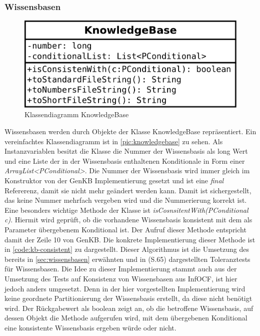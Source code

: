 \documentclass[12pt,a4paper]{article}
\begin{document}
\subsubsection{Wissensbasen}



\begin{figure}
\includegraphics[width=0.45\linewidth]{bilder/KnowledgeBase.png}
\caption{Klassendiagramm KnowledgeBase}
\label{pic:knowledgebase}
\end{figure}



Wissensbasen werden durch Objekte der Klasse KnowledgeBase repräsentiert. Ein vereinfachtes Klassendiagramm ist in \autoref{pic:knowledgebase} zu sehen. Als Instanzvariablen besitzt die Klasse die Nummer der Wissensbasis als long Wert und eine Liste der in der Wissensbasis enthaltenen Konditionale in Form einer \textit{ArrayList<PConditional>}. Die Nummer der Wissensbasis wird immer gleich im Konstruktor von der GenKB Implementierung gesetzt und ist eine \textit{final} Refererenz, damit sie nicht mehr geändert werden kann. Damit ist sichergestellt, das keine Nummer mehrfach vergeben wird und die Nummerierung korrekt ist.\\
Eine besonders wichtige Methode der Klasse ist \textit{isCosnsitentWith(PConditional c)}. Hiermit wird geprüft, ob die vorhandene Wissensbasis konsistent mit dem als Parameter übergebenem Konditional ist. Der Aufruf dieser Methode entspricht damit der Zeile 10 von GenKB. Die konkrete Implementierung dieser Methode ist in \autoref{code:kb-consistent} zu dargestellt. Dieser Algorithmus ist die Umsetzung des bereits in \autoref{sec:wissensbasen} erwähnten und in \cite{goldszmidt96}(S.65) dargestellten Toleranztests für Wissensbasen.  Die Idee zu dieser Implementierung stammt auch aus der Umsetzung des Tests auf Konsistenz von Wissensbasen aus InfOCF, ist hier jedoch anders umgesetzt. Denn in der hier vorgestellten Implementierung wird keine geordnete Partitionierung der Wissensbasis erstellt, da diese nicht benötigt wird. Der Rückgabewert als boolean zeigt an, ob die betroffene Wissensbasis, auf dessen Objekt die Methode aufgerufen wird, mit dem übergebenen Konditional eine konsistente Wissensbasis ergeben würde oder nicht.
\end{document}
